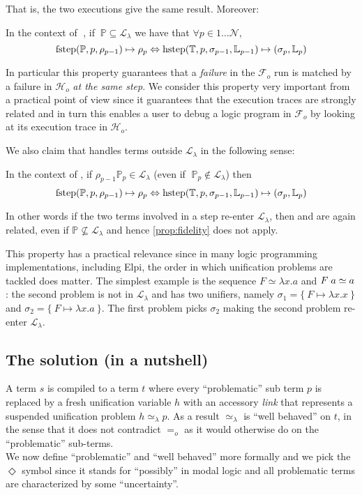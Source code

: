 \documentclass[sigconf,natbib=false,review]{acmart}
\newcommand{\appsep}{\ensuremath{\textcolor{lightgray}{\cdot}}}
\newcommand{\EqualRel}{\ensuremath{=}}
\newcommand{\UnifRel}{\ensuremath{\simeq}}
\newcommand{\Eo}{\ensuremath{\EqualRel_o}\xspace}
\newcommand{\Ue}{\ensuremath{\UnifRel_\lambda}\xspace}
\newcommand{\llambda}{\ensuremath{\mathcal{L}_\lambda}\xspace}
\newcommand{\Fo}{\ensuremath{\mathcal{F}_{\!o}\xspace}} %
\newcommand{\Ho}{\ensuremath{\mathcal{H}_o}\xspace}
\newcommand{\linkStore}{\ensuremath{\mathbb{L}}\xspace}
\newcommand{\foUnifPb}{\ensuremath{\mathbb{P}}\xspace}
\newcommand{\hoUnifPb}{\ensuremath{\mathbb{T}}\xspace}
\begin{document}
\noindent
That is, the two executions give the same result. Moreover:

\begin{proposition}\label{prop:fidelity}
In the context of$\;$ \hrun, if $~\foUnifPb \subseteq \llambda$ we have that
$\forall p \in 1 \ldots \mathcal{N},$
$$
\stepF{\foUnifPb}{p}{\rho_{p-1}}{\rho_p}
\Leftrightarrow
\stepH{\hoUnifPb}{p}{\sigma_{p-1}}{\linkStore_{p-1}}{\sigma_p}{\linkStore_p}
$$
\end{proposition}
\noindent
In particular this property guarantees that a \emph{failure} in the \Fo{} run
is matched by a failure in \Ho{} \emph{at the same step}. We consider this
property very important from a practical point of view since it guarantees
that the execution traces are strongly related and in turn this enables a user
to debug a logic program in \Fo{} by looking at its execution trace in
\Ho{}.

We also claim that \hrun handles terms outside \llambda in the following sense:

\begin{proposition}\label{prop:fidelity-recovery} 
In the context of \hrun, if 
$\rho_{p-1} \foUnifPb_{p} \in \llambda$ 
(even if $\;\foUnifPb_{p} \not\in \llambda$)
then
$$
\stepF{\foUnifPb}{p}{\rho_{p-1}}{\rho_p} \Leftrightarrow
\stepH{\hoUnifPb}{p}{\sigma_{p-1}}{\linkStore_{p-1}}{\sigma_{p}}{\linkStore_p}
$$
\end{proposition}
  
In other words if the two terms involved in a step
re-enter \llambda, then \hstep and \fstep are again related, even if
$\foUnifPb \not\subseteq \llambda$ and hence \cref{prop:fidelity} does not apply.

This property has a practical relevance since in many logic programming
implementations, including Elpi, the order in which unification problems
are tackled does matter.
The simplest example is the sequence $F \UnifRel \lambda x.a$ and
$F \appsep a \UnifRel a$: the second problem is not in \llambda and has two
unifiers, namely $\sigma_1 = \{~ F \mapsto \lambda x.x ~\}$ and
$\sigma_2 = \{~ F \mapsto \lambda x.a ~\}$. The first problem picks $\sigma_2$
making the second problem re-enter \llambda.

\subsection{The solution (in a nutshell)}
\label{sec:nutshell}
A term $s$ is compiled to a term $t$ where every
``problematic'' sub term $p$ is replaced by a fresh unification variable $h$
with an accessory \emph{link} that represents a suspended unification problem
$h \Ue p$. As a result \Ue is ``well behaved'' on $t$, in the sense that
it does not contradict \Eo as it would otherwise do on the
``problematic'' sub-terms.\\
We now define ``problematic'' and ``well behaved'' more formally
and we pick the $\Diamond$ symbol since it
stands for ``possibly'' in modal logic and all problematic terms
are characterized by some ``uncertainty''.
\end{document}

